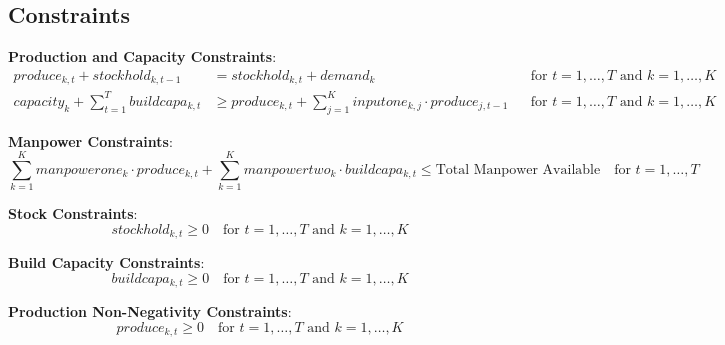 \documentclass{article}
\begin{document}
\subsection*{Constraints}

\textbf{Production and Capacity Constraints}:
\begin{align*}
produce_{k, t} + stockhold_{k, t-1} & = stockhold_{k, t} + demand_k && \text{for } t = 1, \ldots, T \text{ and } k = 1, \ldots, K \\
capacity_k + \sum_{t=1}^{T} buildcapa_{k, t} & \geq produce_{k, t} + \sum_{j=1}^{K} inputone_{k,j} \cdot produce_{j,t-1} && \text{for } t = 1, \ldots, T \text{ and } k = 1, \ldots, K
\end{align*}

\textbf{Manpower Constraints}:
\[
\sum_{k=1}^{K} manpowerone_k \cdot produce_{k, t} + \sum_{k=1}^{K} manpowertwo_k \cdot buildcapa_{k, t} \leq \text{Total Manpower Available} \quad \text{for } t = 1, \ldots, T
\]

\textbf{Stock Constraints}:
\[
stockhold_{k, t} \geq 0 \quad \text{for } t = 1, \ldots, T \text{ and } k = 1, \ldots, K
\]

\textbf{Build Capacity Constraints}:
\[
buildcapa_{k, t} \geq 0 \quad \text{for } t = 1, \ldots, T \text{ and } k = 1, \ldots, K
\]

\textbf{Production Non-Negativity Constraints}:
\[
produce_{k, t} \geq 0 \quad \text{for } t = 1, \ldots, T \text{ and } k = 1, \ldots, K
\]
\end{document}
